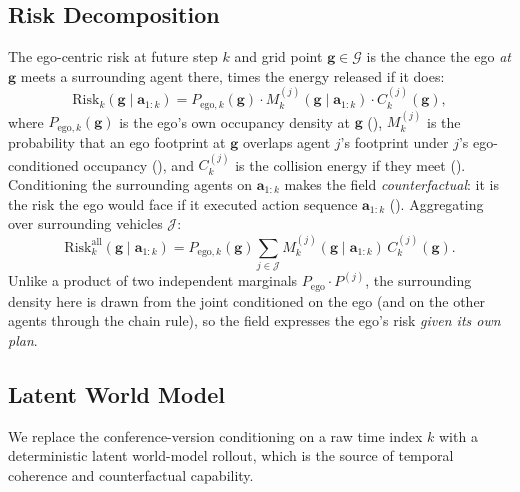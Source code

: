 \documentclass[journal]{IEEEtran}
\begin{document}
\subsection{Risk Decomposition}\label{sec:risk_decomposition}
The ego-centric risk at future step $k$ and grid point $\mathbf{g}\in\mathcal{G}$ is the chance the ego \emph{at} $\mathbf{g}$ meets a surrounding agent there, times the energy released if it does:
\begin{equation}
\mathrm{Risk}_{k}(\mathbf{g}\mid\mathbf{a}_{1:k})=P_{\mathrm{ego},k}(\mathbf{g})\cdot M^{(j)}_{k}(\mathbf{g}\mid\mathbf{a}_{1:k})\cdot C^{(j)}_{k}(\mathbf{g}),
\label{eq:risk_decomp}
\end{equation}
where $P_{\mathrm{ego},k}(\mathbf{g})$ is the ego's own occupancy density at $\mathbf{g}$ (), $M^{(j)}_{k}$ is the probability that an ego footprint at $\mathbf{g}$ overlaps agent $j$'s footprint under $j$'s ego-conditioned occupancy (), and $C^{(j)}_{k}$ is the collision energy if they meet (). Conditioning the surrounding agents on $\mathbf{a}_{1:k}$ makes the field \emph{counterfactual}: it is the risk the ego would face if it executed action sequence $\mathbf{a}_{1:k}$ (). Aggregating over surrounding vehicles $\mathcal{J}$:
\begin{equation}
\mathrm{Risk}^{\mathrm{all}}_{k}(\mathbf{g}\mid\mathbf{a}_{1:k})=P_{\mathrm{ego},k}(\mathbf{g})\sum_{j\in\mathcal{J}} M^{(j)}_{k}(\mathbf{g}\mid\mathbf{a}_{1:k})\,C^{(j)}_{k}(\mathbf{g}).
\label{eq:risk_sum}
\end{equation}
Unlike a product of two independent marginals $P_{\mathrm{ego}}\cdot P^{(j)}$, the surrounding density here is drawn from the joint conditioned on the ego (and on the other agents through the chain rule), so the field expresses the ego's risk \emph{given its own plan}.

\subsection{Latent World Model}\label{sec:world_model}
We replace the conference-version conditioning on a raw time index $k$ with a deterministic latent world-model rollout, which is the source of temporal coherence and counterfactual capability.
\end{document}
